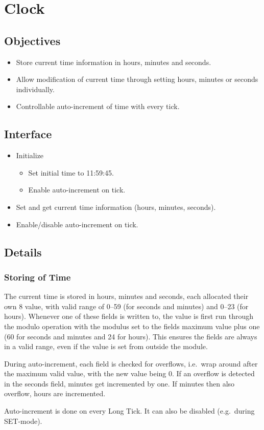 \chapter{Clock}

\section{Objectives}

\begin{itemize}
    \item Store current time information in hours, minutes and seconds.
    \item Allow modification of current time through setting hours, minutes or seconds individually.
    \item Controllable auto-increment of time with every tick.
\end{itemize}

\section{Interface}

\begin{itemize}
    \item Initialize
          \begin{itemize}
              \item Set initial time to 11:59:45.
              \item Enable auto-increment on tick.
          \end{itemize}
    \item Set and get current time information (hours, minutes, seconds).
    \item Enable/disable auto-increment on tick.
\end{itemize}

\section{Details}

\subsection{Storing of Time}

The current time is stored in hours, minutes and seconds, each allocated their own \SI{8}{\bit} value, with valid range of \numrange{0}{59} (for seconds and minutes) and \numrange{0}{23} (for hours). Whenever one of these fields is written to, the value is first run through the modulo operation with the modulus set to the fields maximum value plus one (\num{60} for seconds and minutes and \num{24} for hours). This ensures the fields are always in a valid range, even if the value is set from outside the module.

During auto-increment, each field is checked for overflows, i.e.\ wrap around after the maximum valid value, with the new value being \num{0}. If an overflow is detected in the seconds field, minutes get incremented by one. If minutes then also overflow, hours are incremented.

Auto-increment is done on every Long Tick. It can also be disabled (e.g.\ during SET-mode).
